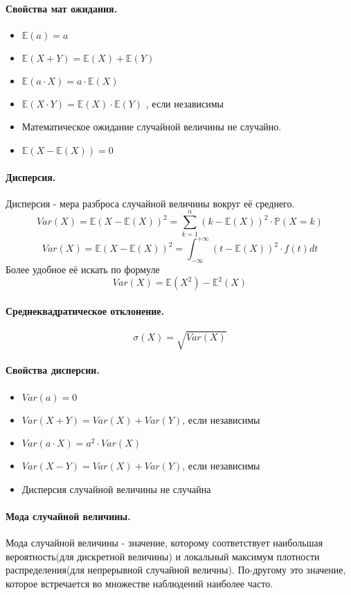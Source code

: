 \documentclass{article}
\newcommand{\E}{\mathbb{E}}
\newcommand{\PP}{\mathbb{P}}
\begin{document}
\paragraph{Свойства мат ожидания.}
\begin{itemize}
    \item $\E(a)=a$
    \item $\E(X+Y)= \E(X) + \E(Y)$
    \item $\E(a \cdot X) = a \cdot \E(X)$
    \item $\E(X \cdot Y) = \E(X) \cdot \E(Y)$ , если независимы
    \item Математическое ожидание случайной величины не случайно.
    \item $\E(X-\E(X)) = 0$
\end{itemize}
\paragraph{Дисперсия.}
Дисперсия - мера разброса случайной величины вокруг её среднего.
\[
Var(X)=\E(X-\E(X))^2 = \sum_{k=1}^{n}(k-\E(X))^2 \cdot \PP(X=k) 
\]
\[
Var(X)=\E(X-\E(X))^2 = \int_{-\infty}^{+\infty}(t-\E(X))^2 \cdot f(t)dt 
\]
Более удобное её искать по формуле
\[
Var(X)=\E(X^2) - \E^2(X)
\]
\paragraph{Среднеквадратическое отклонение.}
\[
\sigma(X) = \sqrt{Var(X)}
\]
\paragraph{Свойства дисперсии.}
\begin{itemize}
    \item $Var(a)=0$
    \item $Var(X+Y)=Var(X)+Var(Y)$, если независимы
    \item $Var(a \cdot X)=a^2 \cdot Var(X)$
    \item $Var(X-Y)=Var(X)+Var(Y)$, если независимы
    \item Дисперсия случайной величины не случайна
\end{itemize}
\paragraph{Мода случайной величины.}
Мода случайной величины - значение, которому соответствует наибольшая вероятность(для дискретной величины) и локальный максимум плотности распределения(для непрерывной случайной величны). По-другому это значение, которое встречается во множестве наблюдений наиболее часто.
\end{document}
